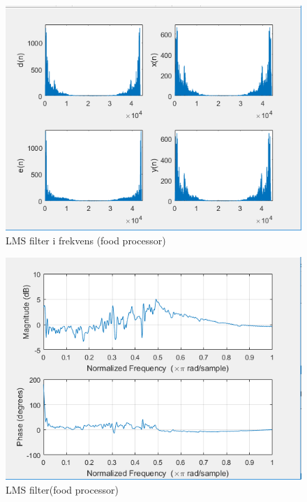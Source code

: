 \begin{figure}[H]
	\centering
	\includegraphics[width = 400pt]{Img/Filter_Freq_food}
	\caption{LMS filter i frekvens (food processor)}
	\label{fig:Filter_Freq_food}
\end{figure}
\newpage

\begin{figure}[H]
	\centering
	\includegraphics[width = 400pt]{Img/Filter_food}
	\caption{LMS filter(food processor)}
	\label{fig:Filter_food}
\end{figure}



